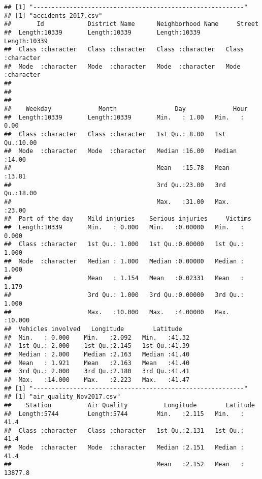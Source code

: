 \documentclass[
]{article}
\begin{document}
\begin{verbatim}
## [1] "----------------------------------------------------------"
## [1] "accidents_2017.csv"
##       Id            District Name      Neighborhood Name     Street         
##  Length:10339       Length:10339       Length:10339       Length:10339      
##  Class :character   Class :character   Class :character   Class :character  
##  Mode  :character   Mode  :character   Mode  :character   Mode  :character  
##                                                                             
##                                                                             
##                                                                             
##    Weekday             Month                Day             Hour      
##  Length:10339       Length:10339       Min.   : 1.00   Min.   : 0.00  
##  Class :character   Class :character   1st Qu.: 8.00   1st Qu.:10.00  
##  Mode  :character   Mode  :character   Median :16.00   Median :14.00  
##                                        Mean   :15.78   Mean   :13.81  
##                                        3rd Qu.:23.00   3rd Qu.:18.00  
##                                        Max.   :31.00   Max.   :23.00  
##  Part of the day    Mild injuries    Serious injuries     Victims      
##  Length:10339       Min.   : 0.000   Min.   :0.00000   Min.   : 0.000  
##  Class :character   1st Qu.: 1.000   1st Qu.:0.00000   1st Qu.: 1.000  
##  Mode  :character   Median : 1.000   Median :0.00000   Median : 1.000  
##                     Mean   : 1.154   Mean   :0.02331   Mean   : 1.179  
##                     3rd Qu.: 1.000   3rd Qu.:0.00000   3rd Qu.: 1.000  
##                     Max.   :10.000   Max.   :4.00000   Max.   :10.000  
##  Vehicles involved   Longitude        Latitude    
##  Min.   : 0.000    Min.   :2.092   Min.   :41.32  
##  1st Qu.: 2.000    1st Qu.:2.145   1st Qu.:41.39  
##  Median : 2.000    Median :2.163   Median :41.40  
##  Mean   : 1.921    Mean   :2.163   Mean   :41.40  
##  3rd Qu.: 2.000    3rd Qu.:2.180   3rd Qu.:41.41  
##  Max.   :14.000    Max.   :2.223   Max.   :41.47  
## [1] "----------------------------------------------------------"
## [1] "air_quality_Nov2017.csv"
##    Station          Air Quality          Longitude        Latitude       
##  Length:5744        Length:5744        Min.   :2.115   Min.   :    41.4  
##  Class :character   Class :character   1st Qu.:2.131   1st Qu.:    41.4  
##  Mode  :character   Mode  :character   Median :2.151   Median :    41.4  
##                                        Mean   :2.152   Mean   : 13877.8  

\end{verbatim}
\end{document}
